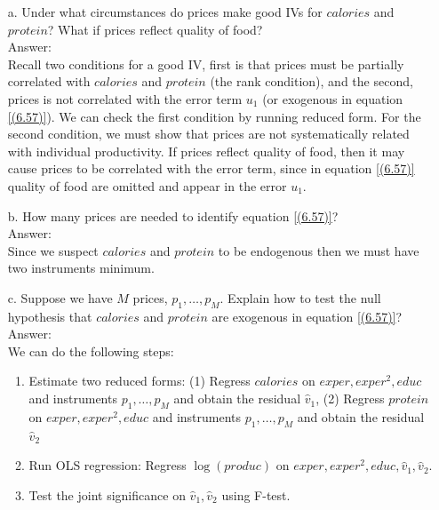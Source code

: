 \documentclass[10pt]{article}
\begin{document}
\begin{enumerate}
\item[a.] Under what circumstances do prices make good IVs for $calories$ and $protein$? What if prices reflect quality of food?
\\ Answer: \\
Recall two conditions for a good IV, first is that prices must be partially correlated with $calories$ and $protein$ (the rank condition), and the second, prices is not correlated with the error term $u_1$ (or exogenous in equation \eqref{(6.57)}). We can check the first condition by running reduced form. For the second condition, we must show that prices are not systematically related with individual productivity. If prices reflect quality of food, then it may cause prices to be correlated with the error term, since in equation \eqref{(6.57)} quality of food are omitted and appear in the error $u_1$.

\item[b.] How many prices are needed to identify equation \eqref{(6.57)}?
\\ Answer: \\
Since we suspect $calories$ and $protein$ to be endogenous then we must have two instruments minimum. 

\item[c.] Suppose we have $M$ prices, $p_1,\ldots,p_M.$ Explain how to test the null hypothesis that $calories$ and $protein$ are exogenous in equation \eqref{(6.57)}?
\\ Answer: \\
We can do the following steps:
\begin{enumerate}
    \item Estimate two reduced forms: (1) Regress $calories$ on $exper,exper^2, educ$ and instruments $p_1,\ldots,p_M$ and obtain the residual $\hat{v}_1$, (2) Regress $protein$ on $exper,exper^2, educ$ and instruments $p_1,\ldots,p_M$ and obtain the residual $\hat{v}_2$
    \item Run OLS regression: Regress $\log(produc)$ on $exper,exper^2,educ,\hat{v}_1,\hat{v}_2.$
    \item Test the joint significance on $\hat{v}_1,\hat{v}_2$ using F-test.
\end{enumerate}
\end{enumerate}\\ 
\end{document}
